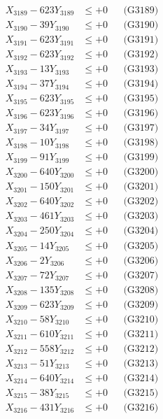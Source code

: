 \documentclass[a4paper,10pt]{article}
\begin{document}
{\begin{align}
X_{3189} - 623Y_{3189} &\leq +0 && \text{(G3189)} \\
X_{3190} - 39Y_{3190} &\leq +0 && \text{(G3190)} \\
\allowbreak
X_{3191} - 623Y_{3191} &\leq +0 && \text{(G3191)} \\
X_{3192} - 623Y_{3192} &\leq +0 && \text{(G3192)} \\
X_{3193} - 13Y_{3193} &\leq +0 && \text{(G3193)} \\
X_{3194} - 37Y_{3194} &\leq +0 && \text{(G3194)} \\
X_{3195} - 623Y_{3195} &\leq +0 && \text{(G3195)} \\
X_{3196} - 623Y_{3196} &\leq +0 && \text{(G3196)} \\
X_{3197} - 34Y_{3197} &\leq +0 && \text{(G3197)} \\
X_{3198} - 10Y_{3198} &\leq +0 && \text{(G3198)} \\
X_{3199} - 91Y_{3199} &\leq +0 && \text{(G3199)} \\
X_{3200} - 640Y_{3200} &\leq +0 && \text{(G3200)} \\
\allowbreak
X_{3201} - 150Y_{3201} &\leq +0 && \text{(G3201)} \\
X_{3202} - 640Y_{3202} &\leq +0 && \text{(G3202)} \\
X_{3203} - 461Y_{3203} &\leq +0 && \text{(G3203)} \\
X_{3204} - 250Y_{3204} &\leq +0 && \text{(G3204)} \\
X_{3205} - 14Y_{3205} &\leq +0 && \text{(G3205)} \\
X_{3206} - 2Y_{3206} &\leq +0 && \text{(G3206)} \\
X_{3207} - 72Y_{3207} &\leq +0 && \text{(G3207)} \\
X_{3208} - 135Y_{3208} &\leq +0 && \text{(G3208)} \\
X_{3209} - 623Y_{3209} &\leq +0 && \text{(G3209)} \\
X_{3210} - 58Y_{3210} &\leq +0 && \text{(G3210)} \\
\allowbreak
X_{3211} - 610Y_{3211} &\leq +0 && \text{(G3211)} \\
X_{3212} - 558Y_{3212} &\leq +0 && \text{(G3212)} \\
X_{3213} - 51Y_{3213} &\leq +0 && \text{(G3213)} \\
X_{3214} - 640Y_{3214} &\leq +0 && \text{(G3214)} \\
X_{3215} - 38Y_{3215} &\leq +0 && \text{(G3215)} \\
X_{3216} - 431Y_{3216} &\leq +0 && \text{(G3216)} \\

\end{align}}
\end{document}
